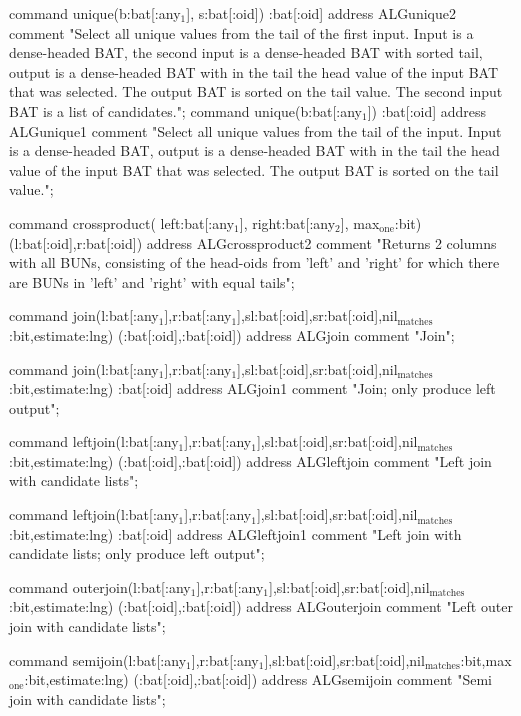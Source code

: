 \documentclass[11pt]{article}
\begin{document}
command unique(b:bat[:any\(_{\text{1}}\)], s:bat[:oid]) :bat[:oid]
address ALGunique2
comment "Select all unique values from the tail of the first input.
	Input is a dense-headed BAT, the second input is a
	dense-headed BAT with sorted tail, output is a dense-headed
	BAT with in the tail the head value of the input BAT that was
	selected.  The output BAT is sorted on the tail value.  The
	second input BAT is a list of candidates.";
command unique(b:bat[:any\(_{\text{1}}\)]) :bat[:oid]
address ALGunique1
comment "Select all unique values from the tail of the input.
	Input is a dense-headed BAT, output is a dense-headed BAT with
	in the tail the head value of the input BAT that was selected.
	The output BAT is sorted on the tail value.";


command crossproduct( left:bat[:any\(_{\text{1}}\)], right:bat[:any\(_{\text{2}}\)], max\(_{\text{one}}\):bit)
		(l:bat[:oid],r:bat[:oid])
address ALGcrossproduct2
comment "Returns 2 columns with all BUNs, consisting of the head-oids
	  from 'left' and 'right' for which there are BUNs in 'left'
	  and 'right' with equal tails";

command join(l:bat[:any\(_{\text{1}}\)],r:bat[:any\(_{\text{1}}\)],sl:bat[:oid],sr:bat[:oid],nil\(_{\text{matches}}\):bit,estimate:lng) (:bat[:oid],:bat[:oid])
address ALGjoin
comment "Join";

command join(l:bat[:any\(_{\text{1}}\)],r:bat[:any\(_{\text{1}}\)],sl:bat[:oid],sr:bat[:oid],nil\(_{\text{matches}}\):bit,estimate:lng) :bat[:oid]
address ALGjoin1
comment "Join; only produce left output";

command leftjoin(l:bat[:any\(_{\text{1}}\)],r:bat[:any\(_{\text{1}}\)],sl:bat[:oid],sr:bat[:oid],nil\(_{\text{matches}}\):bit,estimate:lng) (:bat[:oid],:bat[:oid])
address ALGleftjoin
comment "Left join with candidate lists";

command leftjoin(l:bat[:any\(_{\text{1}}\)],r:bat[:any\(_{\text{1}}\)],sl:bat[:oid],sr:bat[:oid],nil\(_{\text{matches}}\):bit,estimate:lng) :bat[:oid]
address ALGleftjoin1
comment "Left join with candidate lists; only produce left output";

command outerjoin(l:bat[:any\(_{\text{1}}\)],r:bat[:any\(_{\text{1}}\)],sl:bat[:oid],sr:bat[:oid],nil\(_{\text{matches}}\):bit,estimate:lng) (:bat[:oid],:bat[:oid])
address ALGouterjoin
comment "Left outer join with candidate lists";

command semijoin(l:bat[:any\(_{\text{1}}\)],r:bat[:any\(_{\text{1}}\)],sl:bat[:oid],sr:bat[:oid],nil\(_{\text{matches}}\):bit,max\(_{\text{one}}\):bit,estimate:lng) (:bat[:oid],:bat[:oid])
address ALGsemijoin
comment "Semi join with candidate lists";
\end{document}
